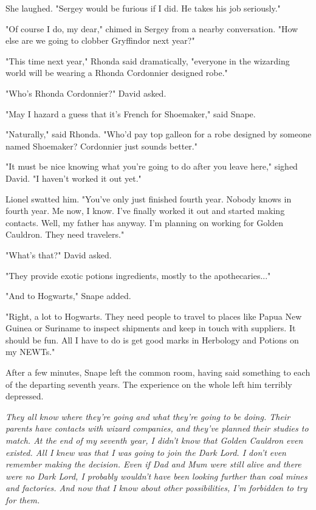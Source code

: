 \documentclass[a4paper,11pt]{article}
\begin{document}
She laughed. "Sergey would be furious if I did. He takes his job seriously."

"Of course I do, my dear," chimed in Sergey from a nearby conversation. "How else are we going to clobber Gryffindor next year?"

"This time next year," Rhonda said dramatically, "everyone in the wizarding world will be wearing a Rhonda Cordonnier designed robe."

"Who's Rhonda Cordonnier?" David asked.

"May I hazard a guess that it's French for Shoemaker," said Snape.

"Naturally," said Rhonda. "Who'd pay top galleon for a robe designed by someone named Shoemaker? Cordonnier just sounds better."

"It must be nice knowing what you're going to do after you leave here," sighed David. "I haven't worked it out yet."

Lionel swatted him. "You've only just finished fourth year. Nobody knows in fourth year. Me now, I know. I've finally worked it out and started making contacts. Well, my father has anyway. I'm planning on working for Golden Cauldron. They need travelers."

"What's that?" David asked.

"They provide exotic potions ingredients, mostly to the apothecaries..."

"And to Hogwarts," Snape added.

"Right, a lot to Hogwarts. They need people to travel to places like Papua New Guinea or Suriname to inspect shipments and keep in touch with suppliers. It should be fun. All I have to do is get good marks in Herbology and Potions on my NEWTs."

After a few minutes, Snape left the common room, having said something to each of the departing seventh years. The experience on the whole left him terribly depressed.

\emph{They all know where they're going and what they're going to be doing. Their parents have contacts with wizard companies, and they've planned their studies to match. At the end of my seventh year, I didn't know that Golden Cauldron even existed. All I knew was that I was going to join the Dark Lord. I don't even remember making the decision. Even if Dad and Mum were still alive and there were no Dark Lord, I probably wouldn't have been looking further than coal mines and factories. And now that I know about other possibilities, I'm forbidden to try for them.}
\end{document}
